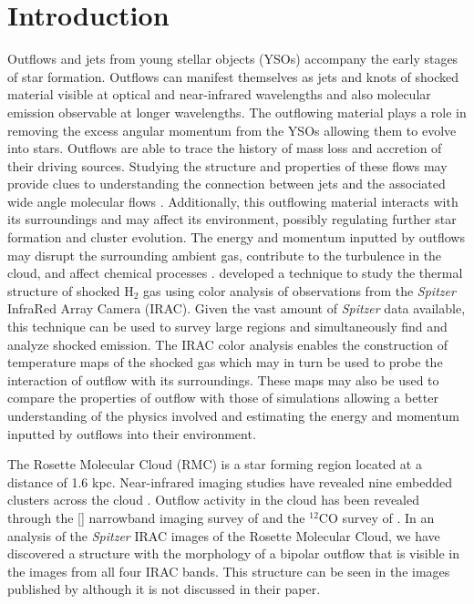 \documentclass[iop]{emulateapj}
\begin{document}
\section{Introduction}


Outflows and jets from young stellar objects (YSOs) accompany
the early stages of star formation. Outflows can manifest themselves
as jets and knots of shocked material visible at optical and
near-infrared wavelengths and also molecular emission observable
at longer wavelengths. The outflowing material plays
a role in removing the excess angular momentum from the 
YSOs allowing them to evolve into stars. 
%
Outflows are able to trace the history of mass loss and accretion
of their driving sources. 
%
Studying the structure and properties of these flows may
provide clues to understanding the connection between jets and
the associated wide angle molecular flows \citep{rei2001}.
Additionally, this outflowing material
interacts with its surroundings and may affect its environment, 
possibly regulating further star formation and cluster evolution.
The energy and momentum inputted by outflows may disrupt
the surrounding ambient gas, contribute to the turbulence in the cloud,
and affect chemical processes \citep{bal2007}.
\citet{yba2009} developed a technique to study 
the thermal structure of shocked H$_2$ gas
using color analysis of observations from the \emph{Spitzer} InfraRed 
Array Camera (IRAC). 
Given the vast amount of \emph{Spitzer} data  available, this technique
can be used to survey large regions and simultaneously find and analyze
shocked emission.
The IRAC color analysis enables the construction of temperature maps of the shocked gas which may in turn be used to probe the interaction of outflow with its surroundings. 
These maps may also be used to compare 
the properties of outflow with those of simulations allowing a better 
understanding of the physics involved and estimating the
energy and momentum inputted by outflows into their environment.

The Rosette Molecular Cloud (RMC) is a star forming region located at a distance of 
1.6 kpc. Near-infrared imaging studies have revealed nine embedded clusters across
the cloud \citep{phe1997,rom2008}.  Outflow activity in the cloud has been revealed
through the [] narrowband imaging survey of \citet{yba2004} and the 
$^{12}$CO survey of \citet{den2009}.
In an analysis of the \emph{Spitzer} IRAC images of the Rosette Molecular Cloud, 
we have discovered a
structure with the morphology of a bipolar outflow that is visible in
the images from all four IRAC bands. 
This structure can be seen in the images published by \citet{pou2008} although it 
is not discussed in their paper.
\end{document}
